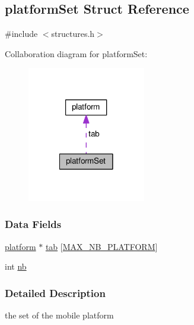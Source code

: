 \hypertarget{structplatform_set}{\subsection{platform\-Set Struct Reference}
\label{structplatform_set}
}


{\ttfamily \#include $<$structures.\-h$>$}



Collaboration diagram for platform\-Set\-:
\nopagebreak
\begin{figure}[H]
\begin{center}
\leavevmode
\includegraphics[width=146pt]{structplatform_set__coll__graph}
\end{center}
\end{figure}
\subsubsection*{Data Fields}
\begin{DoxyCompactItemize}
\item 
\hyperlink{structplatform}{platform} $\ast$ \hyperlink{structplatform_set_adc68016a9ab856bd20fb14c5c71c234a}{tab} \mbox{[}\hyperlink{const_8h_aefda3e54987cddb9821a74090f767366}{M\-A\-X\-\_\-\-N\-B\-\_\-\-P\-L\-A\-T\-F\-O\-R\-M}\mbox{]}
\item 
int \hyperlink{structplatform_set_ab310c6afcc676eab3930dce2650511c0}{nb}
\end{DoxyCompactItemize}


\subsubsection{Detailed Description}
the set of the mobile platform 


